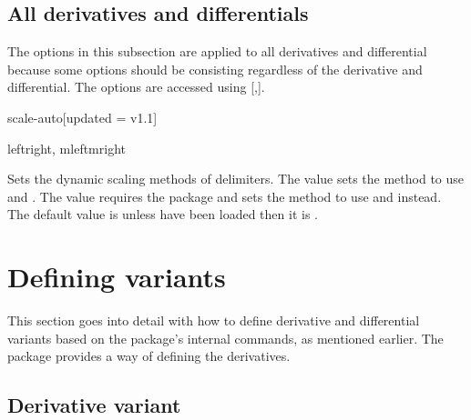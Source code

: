 	\subsection{All derivatives and differentials} \label{ssec:both_options}
	The options in this subsection are applied to all derivatives and differential because some options should be consisting regardless of the derivative and differential. The options are accessed using \macro{\derivset}[,].
	
	\begin{option}{scale-auto}[updated = v1.1]
		\begin{values}[default = {leftright, mleftmright\req}]
			leftright, mleftmright\req
		\end{values}
		Sets the dynamic scaling methods of delimiters. The value  sets the method to use  and . The value  requires the  package and sets the method to use  and  instead. The default value is  unless  have been loaded then it is .
	\end{option}
	
	
	\clearpage
	\section{Defining variants} \label{sec:defvar}
	This section goes into detail with how to define derivative and differential variants based on the package's internal commands, as mentioned earlier. The \mypackage{} package provides a  way of defining the derivatives.
	
	\subsection{Derivative variant} \label{ssec:defvar_dv}
	
